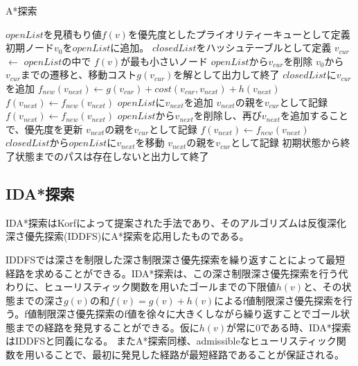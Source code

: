\documentclass[a4paper,11pt,oneside,openany]{jsbook}
\begin{document}
\newpage
\begin{algorithm}
\caption{A*探索}
\label{alg:pbnf}
\begin{algorithmic}[1]
\State $openList$を見積もり値$f(v)$を優先度としたプライオリティーキューとして定義
\State 初期ノード$v_0$を$openList$に追加。
\State $closedList$をハッシュテーブルとして定義
    \State $v_{cur}$ $\leftarrow$ $openList$の中で $f(v)$が最も小さいノード
    \State $openList$から$v_{cur}$を削除
        \State $v_0$から$v_{cur}$までの遷移と、移動コスト$g(v_{cur})$を解として出力して終了
    \EndIf
    \State $closedList$に$v_{cur}$を追加
        \State $f_{new}(v_{next}) \leftarrow g(v_{cur}) + cost(v_{cur}, v_{next}) + h(v_{next})$
            \State $f(v_{next}) \leftarrow f_{new}(v_{next})$ 
            \State $openList$に$v_{next}$を追加
            \State $v_{next}$の親を$v_{cur}$として記録
        \EndIf
            \State $f(v_{next}) \leftarrow f_{new}(v_{next})$
            \State $openList$から$v_{next}$を削除し、再び$v_{next}$を追加することで、優先度を更新
            \State $v_{next}$の親を$v_{cur}$として記録
        \EndIf
            \State $f(v_{next}) \leftarrow f_{new}(v_{next})$
            \State $closedList$から$openList$に$v_{next}$を移動
            \State $v_{next}$の親を$v_{cur}$として記録
        \EndIf
    \EndFor
\EndWhile
\State 初期状態から終了状態までのパスは存在しないと出力して終了
\end{algorithmic}
\end{algorithm}
\newpage

\subsection{IDA*探索}
IDA*探索\cite{Kor85}はKorfによって提案された手法であり、そのアルゴリズムは反復深化深さ優先探索(IDDFS)にA*探索を応用したものである。

IDDFSでは深さを制限した深さ制限深さ優先探索を繰り返すことによって最短経路を求めることができる。IDA*探索は、この深さ制限深さ優先探索を行う代わりに、ヒューリスティック関数を用いたゴールまでの下限値$h(v)$と、その状態までの深さ$g(v)$の和$f(v) = g(v) + h(v)$によるf値制限深さ優先探索を行う。f値制限深さ優先探索のf値を徐々に大きくしながら繰り返すことでゴール状態までの経路を発見することができる。仮に$h(v)$が常に0である時、IDA*探索はIDDFSと同義になる。
またA*探索同様、admissibleなヒューリスティック関数を用いることで、最初に発見した経路が最短経路であることが保証される。
\end{document}
